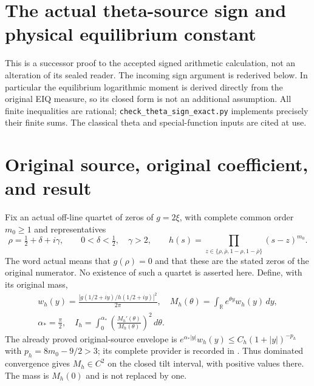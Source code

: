 \endgroup

\clearpage
\begingroup
\def\dd{\,d}

\setcounter{equation}{0}
\renewcommand{\theequation}{A02TS.\arabic{equation}}
\section*{The actual theta-source sign and physical equilibrium constant}



This is a successor proof to the accepted signed arithmetic calculation,
not an alteration of its sealed reader. The incoming sign argument is
rederived below. In particular the equilibrium logarithmic moment is
derived directly from the original EIQ measure, so its closed form is
not an additional assumption. All finite inequalities are rational;
\texttt{check\_theta\_sign\_exact.py} implements precisely their finite sums.
The classical theta and special-function inputs are cited at use.

\section{Original source, original coefficient, and result}
Fix an actual off-line quartet of zeros of $g=2\xi$, with complete common
order $m_0\geq1$ and representatives
\begin{equation}\tag{TS1}
 \rho=\tfrac12+\delta+i\gamma,\qquad 0<\delta<\tfrac12,\quad\gamma>2,
 \qquad
 h(s)=\prod_{z\in\{\rho,\bar\rho,1-\rho,1-\bar\rho\}}(s-z)^{m_0}.
\end{equation}
The word actual means that $g(\rho)=0$ and that these are the stated
zeros of the original numerator. No existence of such a quartet is
asserted here. Define, with its original mass,
\begin{equation}\tag{TS2}
\begin{gathered}
 w_h(y)=\frac{|g(1/2+iy)/h(1/2+iy)|^2}{2\pi},\quad
 M_h(\theta)=\int_{\mathbb R}e^{\theta y}w_h(y)\dd y,\\
 \alpha_*=\frac\pi2,\quad
 I_h=\int_0^{\alpha_*}\left(\frac{M_h'(\theta)}{M_h(\theta)}\right)^2\dd\theta.
\end{gathered}
\end{equation}
The already proved original-source envelope is
$e^{\alpha_*|y|}w_h(y)\leq C_h(1+|y|)^{-p_h}$ with
$p_h=8m_0-9/2>3$; its complete provider is recorded in
\cite{a02ts:SBV}. Thus dominated convergence gives $M_h\in C^2$
on the closed tilt interval, with positive values there. The mass is
$M_h(0)$ and is not replaced by one.

